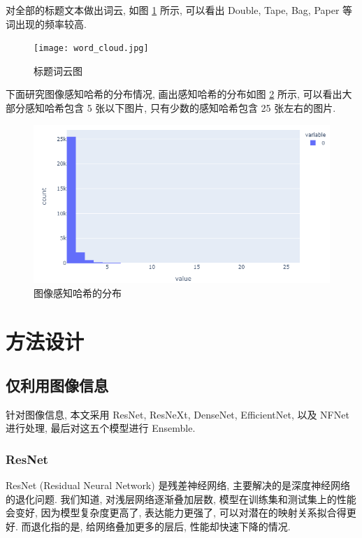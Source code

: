 \documentclass[12pt]{article}
\begin{document}
对全部的标题文本做出词云, 如图 \ref{fig:word_cloud} 所示, 可以看出 Double, Tape, Bag, Paper 等词出现的频率较高.

\begin{figure}[htbp]
  \centering
  \texttt{[image: word\_cloud.jpg]}
  \caption{标题词云图}
  \label{fig:word_cloud}
\end{figure}

下面研究图像感知哈希的分布情况, 画出感知哈希的分布如图 \ref{fig:dist_image_phash} 所示, 可以看出大部分感知哈希包含 5 张以下图片, 只有少数的感知哈希包含 25 张左右的图片.

\begin{figure}[htbp]
  \centering
  \includegraphics[width=14cm]{dist_image_phash.png}
  \caption{图像感知哈希的分布}
  \label{fig:dist_image_phash}
\end{figure}

\section{方法设计}

\subsection{仅利用图像信息}

针对图像信息, 本文采用 ResNet, ResNeXt, DenseNet, EfficientNet, 以及 NFNet 进行处理, 最后对这五个模型进行 Ensemble.

\subsubsection{ResNet}


ResNet (Residual Neural Network) \cite{He2016Deep} 是残差神经网络, 主要解决的是深度神经网络的退化问题. 我们知道, 对浅层网络逐渐叠加层数, 模型在训练集和测试集上的性能会变好, 因为模型复杂度更高了, 表达能力更强了, 可以对潜在的映射关系拟合得更好. 而退化指的是, 给网络叠加更多的层后, 性能却快速下降的情况. 
\end{document}
